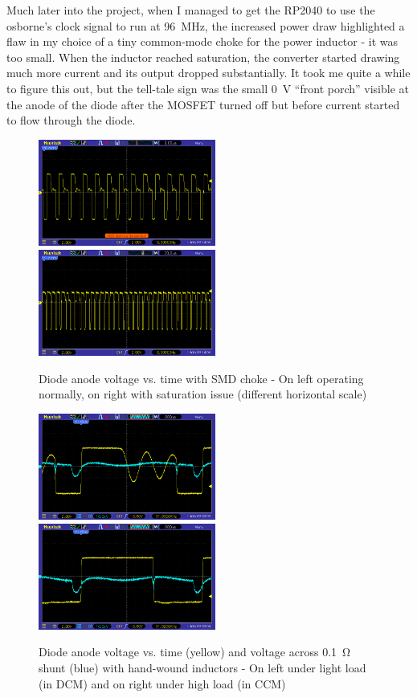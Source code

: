 \documentclass[a4paper]{article}
\begin{document}
Much later into the project, when I managed to get the RP2040 to use
the osborne's clock signal to run at \qty{96}{\MHz}, the increased power draw
highlighted a flaw in my choice of a tiny common-mode choke for the
power inductor - it was too small. When the inductor reached
saturation, the converter started drawing much more current and its
output dropped substantially. It took me quite a while to figure this
out, but the tell-tale sign was the small \qty{0}{\V} ``front porch'' visible at
the anode of the diode after the MOSFET turned off but before current
started to flow through the diode.

\begin{figure}
  \centering
  \includegraphics[height=3.5cm]{pic_23_3}\hfill\includegraphics[height=3.5cm]{pic_23_4}
  \caption[Voltage traces with SMD choke]{Diode anode voltage
    vs. time with SMD choke - On left operating normally, on right
    with saturation issue (different horizontal scale)}
\end{figure}

\begin{figure}
  \centering
  \includegraphics[height=3.5cm]{pic_25_1}\hfill\includegraphics[height=3.5cm]{pic_25_4}
  \caption[Voltage and current traces with handwound inductors]{Diode anode
    voltage vs. time (yellow) and voltage across \qty{0.1}{\ohm} shunt
    (blue) with hand-wound inductors - On left under light
    load (in DCM) and on right under high load (in CCM)}
\end{figure}
\end{document}
